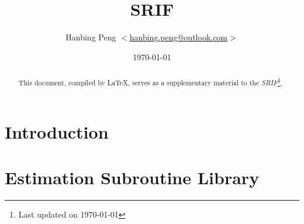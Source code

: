 \documentclass[a4paper,11pt,twoside,openright]{report}
\title{SRIF}
\author{Hanbing Peng $<$\href{mailto:hanbing.peng@outlook.com}{hanbing.peng@outlook.com}$>$}
\date{\today}
\begin{document}
\maketitle

\begin{abstract}
    This document, compiled by \LaTeX, serves as a supplementary material to the
    \emph{SRIF}\footnote{Last updated on \today}.
\end{abstract}

\tableofcontents

\chapter{Introduction}


\appendix
\chapter{Estimation Subroutine Library}


\printindex
\end{document}

